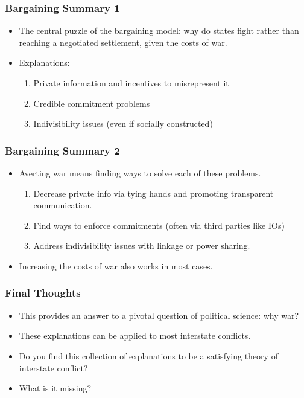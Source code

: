 \documentclass{beamer}
\begin{document}
\begin{frame} 
	\frametitle{\LARGE{Bargaining Summary 1}}
	\begin{itemize}
		\item The central puzzle of the bargaining model: why do states fight rather than reaching a negotiated settlement, given the costs of war. \pause 
		\item Explanations:
		\begin{enumerate}
			\item Private information and incentives to misrepresent it \pause
			\item Credible commitment problems \pause
			\item Indivisibility issues (even if socially constructed) 
		\end{enumerate}
	\end{itemize}
\end{frame}

\begin{frame} 
	\frametitle{\LARGE{Bargaining Summary 2}}
	\begin{itemize}
		\item Averting war means finding ways to solve each of these problems. 
		\begin{enumerate}
			\item Decrease private info via tying hands and promoting transparent communication. \pause
			\item Find ways to enforce commitments (often via third parties like IOs) \pause
			\item Address indivisibility issues with linkage or power sharing. \pause
		\end{enumerate}
		\item Increasing the costs of war also works in most cases.
	\end{itemize}
\end{frame}

\begin{frame} 
	\frametitle{\LARGE{Final Thoughts}}
	\begin{itemize}
		\item This provides an answer to a pivotal question of political science: why war? \pause
		\item These explanations can be applied to most interstate conflicts. \pause
		\item Do you find this collection of explanations to be a satisfying theory of interstate conflict?
		\item What is it missing?
	\end{itemize}
\end{frame}
\end{document}
